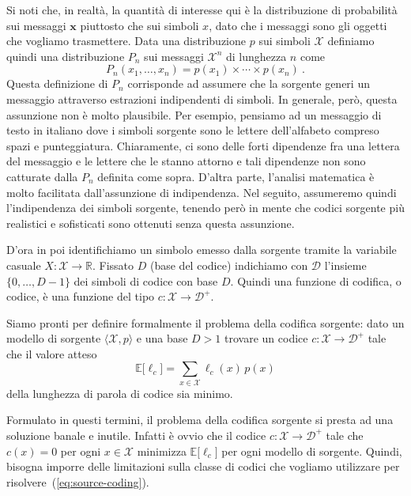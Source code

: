 \documentclass[11pt]{article}
\newcommand{\bx}{ \boldsymbol{x} }
\newcommand{\scD}{\mathcal{D}}
\newcommand{\scX}{\mathcal{X}}
\newcommand{\field}[1]{\mathbb{#1}}
\newcommand{\R}{\field{R}}
\newcommand{\E}{\field{E}}
\begin{document}
Si noti che, in realtà, la quantità di interesse qui è la distribuzione di probabilità sui messaggi $\bx$ piuttosto che sui simboli $x$, dato che i messaggi sono gli oggetti che vogliamo trasmettere. Data una distribuzione $p$ sui simboli $\scX$ definiamo quindi una distribuzione $P_n$ sui messaggi $\scX^n$ di lunghezza $n$ come
\[
    P_n(x_1,\dots,x_n) = p(x_1) \times\cdots\times p(x_n)~.
\]
Questa definizione di $P_n$ corrisponde ad assumere che la sorgente generi un messaggio attraverso estrazioni indipendenti di simboli. In generale, però, questa assunzione non è molto plausibile. Per esempio, pensiamo ad un messaggio di testo in italiano dove i simboli sorgente sono le lettere dell'alfabeto compreso spazi e punteggiatura. Chiaramente, ci sono delle forti dipendenze fra una lettera del messaggio e le lettere che le stanno attorno e tali dipendenze non sono catturate dalla $P_n$ definita come sopra. D'altra parte, l'analisi matematica è molto facilitata dall'assunzione di indipendenza. Nel seguito, assumeremo quindi l'indipendenza dei simboli sorgente, tenendo però in mente che codici sorgente più realistici e sofisticati sono ottenuti senza questa assunzione.

D'ora in poi identifichiamo un simbolo emesso dalla sorgente tramite la variabile casuale $X : \scX\to\R$.
Fissato $D$ (base del codice) indichiamo con $\scD$ l'insieme $\{0,\dots,D-1\}$ dei simboli di codice con base $D$. Quindi una funzione di codifica, o codice, è una funzione del tipo $c : \scX\to\scD^+$.

Siamo pronti per definire formalmente il problema della codifica sorgente: dato un modello di sorgente $\langle\scX,p\rangle$ e una base $D > 1$ trovare un codice $c : \scX\to\scD^+$ tale che il valore atteso
\begin{equation}
\label{eq:source-coding}
    \E\bigl[\ell_c\bigr] = \sum_{x\in\scX} \ell_c(x)\,p(x)
\end{equation}
della lunghezza di parola di codice sia minimo.

Formulato in questi termini, il problema della codifica sorgente si presta ad una soluzione banale e inutile. Infatti è ovvio che il codice $c : \scX\to\scD^+$ tale che $c(x)=0$ per ogni $x\in\scX$ minimizza $\E\bigl[\ell_c\bigr]$ per ogni modello di sorgente. Quindi, bisogna imporre delle limitazioni sulla classe di codici che vogliamo utilizzare per risolvere~(\ref{eq:source-coding}).
\end{document}
